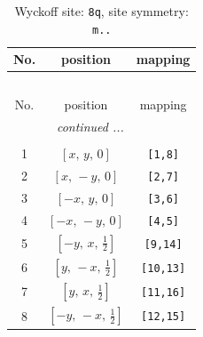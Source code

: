 \documentclass[fleqn,8pt]{jsarticle}
\begin{document}
\begin{longtable}{ccc}
\caption{Wyckoff site: {\tt 8q}, site symmetry: {\tt m..}}
 \\
 \hline \hline
No. & position & mapping \\ \hline \endfirsthead

\multicolumn{2}{l}{\tablename\ \thetable{}} \\
 \hline \hline
No. & position & mapping \\ \hline \endhead

 \hline \hline
\multicolumn{2}{r}{\footnotesize\it continued ...} \\ \endfoot

 \hline \hline
\multicolumn{2}{r}{} \\ \endlastfoot

1 & $\left[ x,\, y,\, 0 \right]$ & {\tt [1,8]} \\ \hline
2 & $\left[ x,\, - y,\, 0 \right]$ & {\tt [2,7]} \\ \hline
3 & $\left[ - x,\, y,\, 0 \right]$ & {\tt [3,6]} \\ \hline
4 & $\left[ - x,\, - y,\, 0 \right]$ & {\tt [4,5]} \\ \hline
5 & $\left[ - y,\, x,\, \frac{1}{2} \right]$ & {\tt [9,14]} \\ \hline
6 & $\left[ y,\, - x,\, \frac{1}{2} \right]$ & {\tt [10,13]} \\ \hline
7 & $\left[ y,\, x,\, \frac{1}{2} \right]$ & {\tt [11,16]} \\ \hline
8 & $\left[ - y,\, - x,\, \frac{1}{2} \right]$ & {\tt [12,15]} \\
\end{longtable}
\renewcommand{\arraystretch}{1.2}
\end{document}
